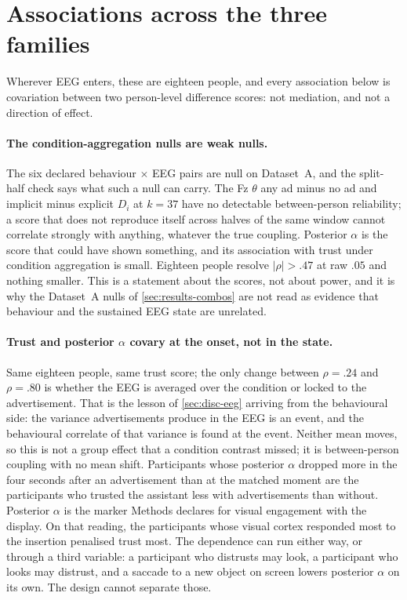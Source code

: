 \section{Associations across the three families}
\label{sec:disc-combos}

Wherever EEG enters, these are eighteen people, and every association below is covariation between two person-level difference scores: not mediation, and not a direction of effect.

\paragraph{The condition-aggregation nulls are weak nulls.}
The six declared behaviour \(\times\) EEG pairs are null on Dataset~A, and the split-half check says what such a null can carry. The Fz \(\theta\) any ad minus no ad and implicit minus explicit \(D_i\) at \(k=37\) have no detectable between-person reliability; a score that does not reproduce itself across halves of the same window cannot correlate strongly with anything, whatever the true coupling. Posterior \(\alpha\) is the score that could have shown something, and its association with trust under condition aggregation is small. Eighteen people resolve \(|\rho|>.47\) at raw \(.05\) and nothing smaller. This is a statement about the scores, not about power, and it is why the Dataset~A nulls of \autoref{sec:results-combos} are not read as evidence that behaviour and the sustained EEG state are unrelated.

\paragraph{Trust and posterior \(\alpha\) covary at the onset, not in the state.}
Same eighteen people, same trust score; the only change between \(\rho=.24\) and \(\rho=.80\) is whether the EEG is averaged over the condition or locked to the advertisement. That is the lesson of \autoref{sec:disc-eeg} arriving from the behavioural side: the variance advertisements produce in the EEG is an event, and the behavioural correlate of that variance is found at the event. Neither mean moves, so this is not a group effect that a condition contrast missed; it is between-person coupling with no mean shift. Participants whose posterior \(\alpha\) dropped more in the four seconds after an advertisement than at the matched moment are the participants who trusted the assistant less with advertisements than without. Posterior \(\alpha\) is the marker Methods declares for visual engagement with the display. On that reading, the participants whose visual cortex responded most to the insertion penalised trust most. The dependence can run either way, or through a third variable: a participant who distrusts may look, a participant who looks may distrust, and a saccade to a new object on screen lowers posterior \(\alpha\) on its own. The design cannot separate those.

